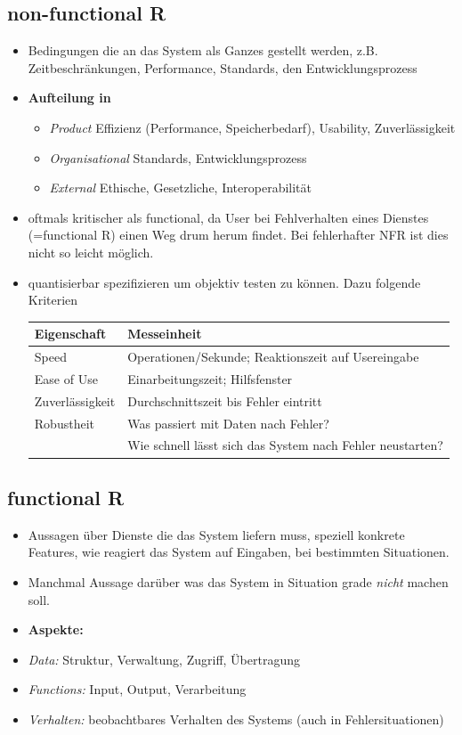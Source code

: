 \subsection{non-functional R}
\begin{itemize}
	\item Bedingungen die an das System als Ganzes gestellt werden, z.B. Zeitbeschränkungen, Performance, Standards, den Entwicklungsprozess
	\item \textbf{Aufteilung in}
	\begin{itemize}
		\item \textit{Product} Effizienz (Performance, Speicherbedarf), Usability, Zuverlässigkeit
		\item \textit{Organisational} Standards, Entwicklungsprozess
		\item \textit{External} Ethische, Gesetzliche, Interoperabilität
	\end{itemize}
	\item oftmals kritischer als functional, da User bei Fehlverhalten eines Dienstes (=functional R) einen Weg drum herum findet. Bei fehlerhafter NFR ist dies nicht so leicht möglich.
	\item quantisierbar spezifizieren um objektiv testen zu können. Dazu folgende Kriterien
	\begin{table}[!h]
		\begin{tabular}{|l|l|}
			\hline
			\textbf{Eigenschaft}	& \textbf{Messeinheit}\\
			\hline
			Speed		& Operationen/Sekunde; Reaktionszeit auf Usereingabe\\
			Ease of Use	& Einarbeitungszeit; Hilfsfenster\\
			Zuverlässigkeit & Durchschnittszeit bis Fehler eintritt\\
			Robustheit & Was passiert mit Daten nach Fehler?\\
			& Wie schnell lässt sich das System nach Fehler neustarten?\\
			\hline
		\end{tabular}
	\end{table}
	
\end{itemize}

\subsection{functional R}
\begin{itemize}
	\item Aussagen über Dienste die das System liefern muss, speziell konkrete Features, wie reagiert das System auf Eingaben, bei bestimmten Situationen.
	\item Manchmal Aussage darüber was das System in Situation grade \textit{nicht} machen soll.
	\item \textbf{Aspekte:}
	\item \textit{Data:} Struktur, Verwaltung, Zugriff, Übertragung
	\item \textit{Functions:} Input, Output, Verarbeitung
	\item \textit{Verhalten:} beobachtbares Verhalten des Systems (auch in Fehlersituationen)
\end{itemize}


